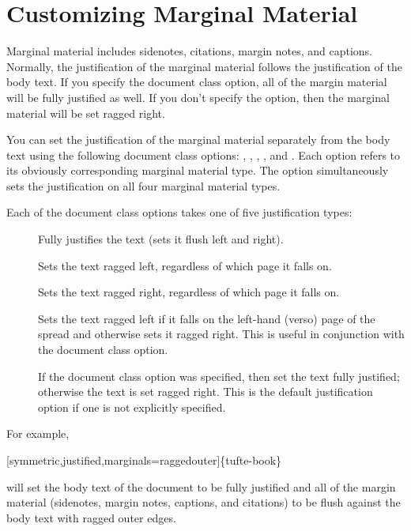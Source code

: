 \section{Customizing Marginal Material}
\label{sec:marginal-material}

Marginal material includes sidenotes, citations, margin notes, and captions.
Normally, the justification of the marginal material follows the justification
of the body text.  If you specify the  document class
option, all of the margin material will be fully justified as well.  If you
don't specify the  option, then the marginal material will
be set ragged right.

You can set the justification of the marginal material separately from the body
text using the following document class options: ,
, , , and
.  Each option refers to its obviously corresponding
marginal material type.  The  option simultaneously sets
the justification on all four marginal material types.

Each of the document class options takes one of five justification types:
\begin{description}
  \item[] Fully justifies the text (sets it flush left and
    right).
  \item[] Sets the text ragged left, regardless of which
    page it falls on.
  \item[] Sets the text ragged right, regardless of
    which page it falls on.
  \item[] Sets the text ragged left if it falls on the
    left-hand (verso) page of the spread and otherwise sets it ragged right.
    This is useful in conjunction with the  document class
    option.
  \item[] If the  document class option
    was specified, then set the text fully justified; otherwise the text is set
    ragged right.  This is the default justification option if one is not
    explicitly specified.
\end{description}

\noindent For example, 
\begin{docspec}
  [symmetric,justified,marginals=raggedouter]\{tufte-book\}
\end{docspec}
will set the body text of the document to be fully justified and all of the
margin material (sidenotes, margin notes, captions, and citations) to be flush
against the body text with ragged outer edges.

